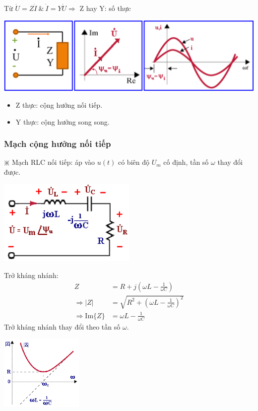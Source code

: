Từ $\dot{U} =Z\dot{I} \ \& \ \dot{I} = Y\dot{U} \Rightarrow$ Z hay Y: số thực
\begin{center}
    \includegraphics[width = 1\textwidth]{./image/63.png}
\end{center}
\begin{itemize}
    \item Z thực: cộng hưởng nối tiếp.
    \item Y thực: cộng hưởng song song.
\end{itemize}
\subsubsection{Mạch cộng hưởng nối tiếp}
$\divideontimes$ Mạch RLC nối tiếp: áp vào $u(t)$ có biên độ $U_m$ cố định, tần số $\omega$ thay đổi được.
\begin{center}
    \includegraphics[width = 0.5\textwidth]{./image/64.png}
\end{center}
Trở kháng nhánh:
\begin{equation}
    \begin{aligned}
        Z &= R + j\left(\omega L - \frac{1}{\omega C}\right) \\
        \Rightarrow |Z| &= \sqrt{R^2 + \left(\omega L - \frac{1}{\omega C}\right)^2} \\
        \Rightarrow \text{Im} \lbrace Z \rbrace &= \omega L - \frac{1}{\omega C}
    \end{aligned}
\end{equation}
Trở kháng nhánh thay đổi theo tần số $\omega$.
\begin{center}
    \includegraphics[width = 0.3\textwidth]{./image/65.png}
\end{center}

